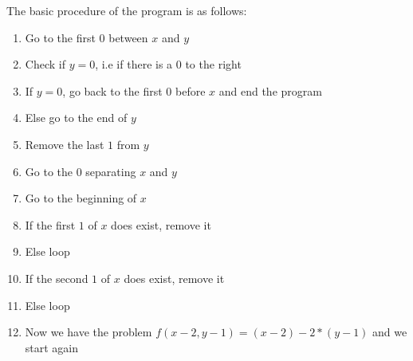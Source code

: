 \documentclass[11pt,a4paper]{article}
\begin{document}
The basic procedure of the program is as follows:
\begin{enumerate}
\item Go to the first $0$ between $x$ and $y$
\item Check if $y=0$, i.e if there is a $0$ to the right 
\item If $y=0$, go back to the first $0$ before $x$ and end the program
\item Else go to the end of $y$
\item Remove the last $1$ from $y$
\item Go to the $0$ separating $x$ and $y$
\item Go to the beginning of $x$
\item If the first $1$ of $x$ does exist, remove it
\item Else loop
\item If the second $1$ of $x$ does exist, remove it
\item Else loop
\item Now we have the problem $f(x-2,y-1)=(x-2)-2*(y-1)$ and we start again
\end{enumerate}
\end{document}
